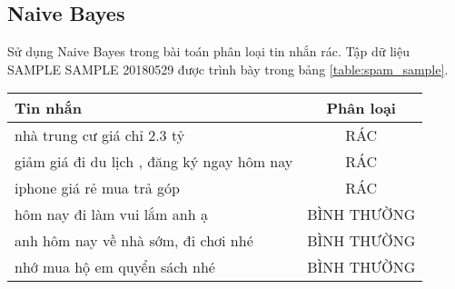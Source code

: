 


\clearpage

\begin{appendices}
\section{Naive Bayes}
Sử dụng Naive Bayes trong bài toán phân loại tin nhắn rác. Tập dữ liệu SAMPLE SAMPLE 20180529 được trình bày trong bảng \ref{table:spam_sample}.

\begin{table*}
  \centering
  \begin{tabular}{lc}
    \toprule
    Tin nhắn & Phân loại \\
    \midrule
    nhà trung cư giá chỉ 2.3 tỷ & RÁC \\
    giảm giá đi du lịch , đăng ký ngay hôm nay & RÁC \\
    iphone giá rẻ mua trả góp & RÁC \\
    hôm nay đi làm vui lắm anh ạ & BÌNH THƯỜNG \\
		anh hôm nay về nhà sớm, đi chơi nhé & BÌNH THƯỜNG \\
		nhớ mua hộ em quyển sách nhé & BÌNH THƯỜNG
    \bottomrule
  \end{tabular}


  \caption{\small Dữ liệu tin nhắn rác SPAM SAMPLE 20180529}
  \label{table:spam_sample}
\end{table*}



\end{appendices}